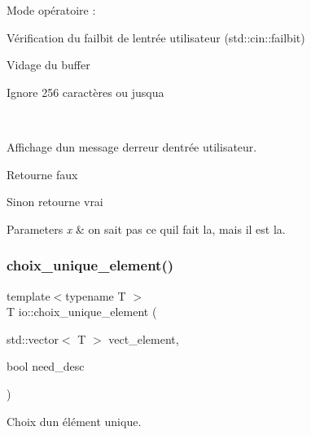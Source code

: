 Mode opératoire \+:
\begin{DoxyItemize}
\item Vérification du failbit de l\textquotesingle{}entrée utilisateur (std\+::cin\+::failbit)
\begin{DoxyEnumerate}
\item Vidage du buffer
\item Ignore 256 caractères ou jusqu\textquotesingle{}a 
\begin{DoxyPre}~\newline
\end{DoxyPre}

\item Affichage d\textquotesingle{}un message d\textquotesingle{}erreur d\textquotesingle{}entrée utilisateur.
\item Retourne faux
\end{DoxyEnumerate}
\item Sinon retourne vrai 
\begin{DoxyParams}{Parameters}
{\em x} & on sait pas ce qu\textquotesingle{}il fait la, mais il est la. \\
\hline
\end{DoxyParams}

\end{DoxyItemize}\mbox{\label{namespaceio_af398625b832f98bc758b9ea7665a168e}} 
\subsubsection{\texorpdfstring{choix\+\_\+unique\+\_\+element()}{choix\_unique\_element()}}
{\footnotesize\ttfamily template$<$typename T $>$ \\
T io\+::choix\+\_\+unique\+\_\+element (\begin{DoxyParamCaption}\item[{std\+::vector$<$ T $>$}]{vect\+\_\+element,  }\item[{bool}]{need\+\_\+desc }\end{DoxyParamCaption})}



Choix d\textquotesingle{}un élément unique. 

